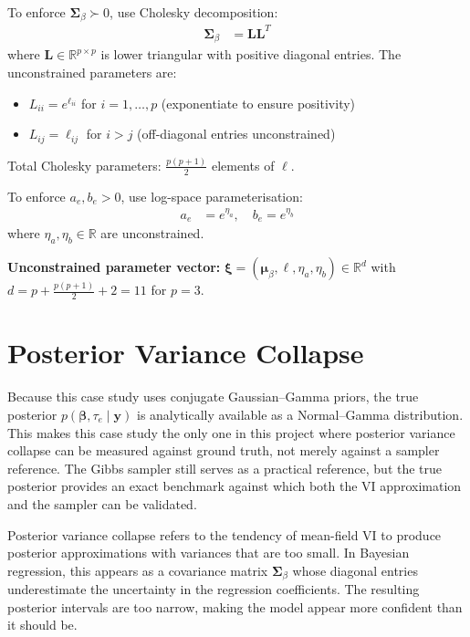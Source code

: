 \documentclass[11pt,a4paper]{article}
\newcommand{\R}{\mathbb{R}}
\begin{document}
To enforce $\bm{\Sigma}_\beta \succ 0$, use Cholesky decomposition:
\begin{align}
\bm{\Sigma}_\beta &= \bm{L}\bm{L}^T
\end{align}
where $\bm{L} \in \R^{p \times p}$ is lower triangular with positive diagonal entries. The unconstrained parameters are:
\begin{itemize}
\item $L_{ii} = e^{\ell_{ii}}$ for $i=1,\ldots,p$ (exponentiate to ensure positivity)
\item $L_{ij} = \ell_{ij}$ for $i > j$ (off-diagonal entries unconstrained)
\end{itemize}

Total Cholesky parameters: $\frac{p(p+1)}{2}$ elements of $\bm{\ell}$.

To enforce $a_e, b_e > 0$, use log-space parameterisation:
\begin{align}
a_e &= e^{\eta_a}, \quad b_e = e^{\eta_b}
\end{align}
where $\eta_a, \eta_b \in \R$ are unconstrained.

\textbf{Unconstrained parameter vector:} $\bm{\xi} = (\bm{\mu}_\beta, \bm{\ell}, \eta_a, \eta_b) \in \R^d$ with $d = p + \frac{p(p+1)}{2} + 2 = 11$ for $p=3$.

\section{Posterior Variance Collapse}
\label{sec:posterior-variance-collapse}

Because this case study uses conjugate Gaussian--Gamma priors, the true posterior $p(\bm{\beta}, \tau_e \mid \bm{y})$ is analytically available as a Normal--Gamma distribution. This makes this case study the only one in this project where posterior variance collapse can be measured against ground truth, not merely against a sampler reference. The Gibbs sampler still serves as a practical reference, but the true posterior provides an exact benchmark against which both the VI approximation and the sampler can be validated.

Posterior variance collapse refers to the tendency of mean-field VI to produce posterior approximations with variances that are too small. In Bayesian regression, this appears as a covariance matrix $\bm{\Sigma}_\beta$ whose diagonal entries underestimate the uncertainty in the regression coefficients. The resulting posterior intervals are too narrow, making the model appear more confident than it should be.
\end{document}
